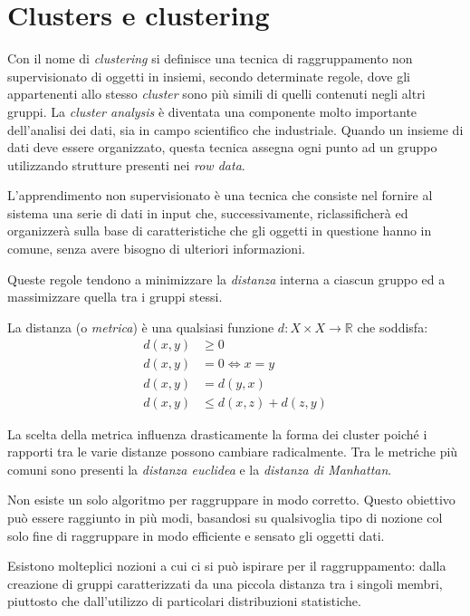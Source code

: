 \chapter{Clusters e clustering}
	Con il nome di \emph{clustering} si definisce una tecnica di raggruppamento non supervisionato di oggetti in insiemi, secondo determinate regole, dove gli appartenenti allo stesso \emph{cluster} sono più simili di quelli contenuti negli altri gruppi. La \emph{cluster analysis} è diventata una componente molto importante dell'analisi dei dati, sia in campo scientifico che industriale. Quando un insieme di dati deve essere organizzato, questa tecnica assegna ogni punto ad un gruppo utilizzando strutture presenti nei \emph{row data}.

	L'apprendimento non supervisionato è una tecnica che consiste nel fornire al sistema una serie di dati in input che, successivamente, riclassificherà ed organizzerà sulla base di caratteristiche che gli oggetti in questione hanno in comune, senza avere bisogno di ulteriori informazioni\cite{apprendimento_non_supervisionato}.

	Queste regole tendono a minimizzare la \emph{distanza} interna a ciascun gruppo ed a massimizzare quella tra i gruppi stessi.

	La distanza (o \emph{metrica}) è una qualsiasi funzione $d:X \times X \to \mathbb{R}$ che soddisfa\cite{definizione_di_distanza}:
	\begin{align*}
		d(x,y) &\geq 0 \\
		d(x,y) &= 0 \iff x=y \\
		d(x,y) &= d(y,x) \\
		d(x,y) &\leq d(x,z) + d(z,y)
	\end{align*}

	La scelta della metrica influenza drasticamente la forma dei cluster poiché i rapporti tra le varie distanze possono cambiare radicalmente. Tra le metriche più comuni sono presenti la \emph{distanza euclidea} e la \emph{distanza di Manhattan}\cite{metriche}.

	Non esiste un solo algoritmo per raggruppare in modo corretto. Questo obiettivo può essere raggiunto in più modi, basandosi su qualsivoglia tipo di nozione col solo fine di raggruppare in modo efficiente e sensato gli oggetti dati. 

	Esistono molteplici nozioni a cui ci si può ispirare per il raggruppamento: dalla creazione di gruppi caratterizzati da una piccola distanza tra i singoli membri, piuttosto che dall'utilizzo di particolari distribuzioni statistiche.


